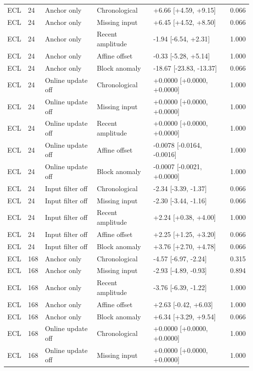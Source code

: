 {\begin{longtable}{lllp{2.5cm}p{4.1cm}r}
ECL & 24 & Anchor only & Chronological & +6.66 [+4.59, +9.15] & 0.066 \\
ECL & 24 & Anchor only & Missing input & +6.45 [+4.52, +8.50] & 0.066 \\
ECL & 24 & Anchor only & Recent amplitude & -1.94 [-6.54, +2.31] & 1.000 \\
ECL & 24 & Anchor only & Affine offset & -0.33 [-5.28, +5.14] & 1.000 \\
ECL & 24 & Anchor only & Block anomaly & -18.67 [-23.83, -13.37] & 0.066 \\
ECL & 24 & Online update off & Chronological & +0.0000 [+0.0000, +0.0000] & 1.000 \\
ECL & 24 & Online update off & Missing input & +0.0000 [+0.0000, +0.0000] & 1.000 \\
ECL & 24 & Online update off & Recent amplitude & +0.0000 [+0.0000, +0.0000] & 1.000 \\
ECL & 24 & Online update off & Affine offset & -0.0078 [-0.0164, -0.0016] & 1.000 \\
ECL & 24 & Online update off & Block anomaly & -0.0007 [-0.0021, +0.0000] & 1.000 \\
ECL & 24 & Input filter off & Chronological & -2.34 [-3.39, -1.37] & 0.066 \\
ECL & 24 & Input filter off & Missing input & -2.30 [-3.44, -1.16] & 0.066 \\
ECL & 24 & Input filter off & Recent amplitude & +2.24 [+0.38, +4.00] & 1.000 \\
ECL & 24 & Input filter off & Affine offset & +2.25 [+1.25, +3.20] & 0.066 \\
ECL & 24 & Input filter off & Block anomaly & +3.76 [+2.70, +4.78] & 0.066 \\
ECL & 168 & Anchor only & Chronological & -4.57 [-6.97, -2.24] & 0.315 \\
ECL & 168 & Anchor only & Missing input & -2.93 [-4.89, -0.93] & 0.894 \\
ECL & 168 & Anchor only & Recent amplitude & -3.76 [-6.39, -1.22] & 1.000 \\
ECL & 168 & Anchor only & Affine offset & +2.63 [-0.42, +6.03] & 1.000 \\
ECL & 168 & Anchor only & Block anomaly & +6.34 [+3.29, +9.54] & 0.066 \\
ECL & 168 & Online update off & Chronological & +0.0000 [+0.0000, +0.0000] & 1.000 \\
ECL & 168 & Online update off & Missing input & +0.0000 [+0.0000, +0.0000] & 1.000 \\

\end{longtable}}
